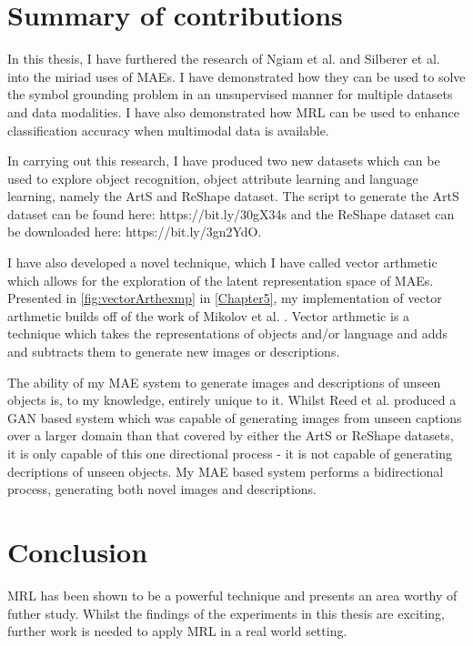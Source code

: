 \section{Summary of contributions}
In this thesis, I have furthered the research of Ngiam et al. \cite{ngiam2011multimodal} and Silberer et al. \cite{silberer2014learning} into the miriad uses of \acp{MAE}. I have demonstrated how they can be used to solve the symbol grounding problem in an unsupervised manner for multiple datasets and data modalities. I have also demonstrated how \ac{MRL} can be used to enhance classification accuracy when multimodal data is available.

In carrying out this research, I have produced two new datasets which can be used to explore object recognition, object attribute learning and language learning, namely the ArtS and ReShape dataset. The script to generate the ArtS dataset can be found here: https://bit.ly/30gX34s and the ReShape dataset can be downloaded here: https://bit.ly/3gn2YdO.

I have also developed a novel technique, which I have called vector arthmetic which allows for the exploration of the latent representation space of \acp{MAE}. Presented in \autoref{fig:vectorArthexmp} in \autoref{Chapter5}, my implementation of vector arthmetic builds off of the work of Mikolov et al. \cite{mikolov2013distributed, mikolov2013efficient, mikolov2013linguistic}. Vector arthmetic is a technique which takes the representations of objects and/or language and adds and subtracts them to generate new images or descriptions. 

The ability of my \ac{MAE} system to generate images and descriptions of unseen objects is, to my knowledge, entirely unique to it. Whilst Reed et al. \cite{reed2016generative} produced a GAN based system which was capable of generating images from unseen captions over a larger domain than that covered by either the ArtS or ReShape datasets, it is only capable of this one directional process - it is not capable of generating decriptions of unseen objects. My \ac{MAE} based system performs a bidirectional process, generating both novel images and descriptions.

\section{Conclusion}
\ac{MRL} has been shown to be a powerful technique and presents an area worthy of futher study. Whilst the findings of the experiments in this thesis are exciting, further work is needed to apply \ac{MRL} in a real world setting.

